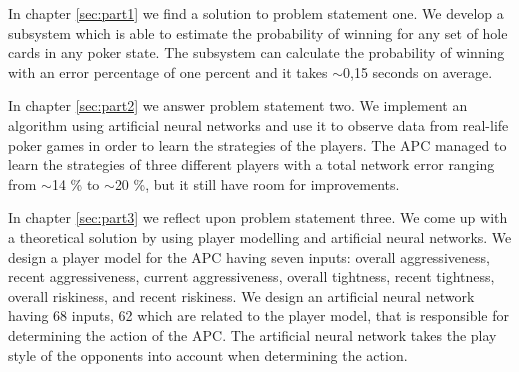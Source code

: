 In chapter \ref{sec:part1} we find a solution to problem statement one. We develop a subsystem which is able to estimate the probability of winning for any set of hole cards in any poker state. The subsystem can calculate the probability of winning with an error percentage of one percent and it takes $\sim$0,15 seconds on average.

In chapter \ref{sec:part2} we answer problem statement two. We implement an algorithm using artificial neural networks and use it to observe data from real-life poker games in order to learn the strategies of the players. The APC managed to learn the strategies of three different players with a total network error ranging from $\sim$14 \% to $\sim$20 \%, but it still have room for improvements.

In chapter \ref{sec:part3} we reflect upon problem statement three. We come up with a theoretical solution by using player modelling and artificial neural networks. We design a player model for the APC having seven inputs: overall aggressiveness, recent aggressiveness, current aggressiveness, overall tightness, recent tightness, overall riskiness, and recent riskiness. 
We design an artificial neural network having 68 inputs, 62 which are related to the player model, that is responsible for determining the action of the APC. The artificial neural network takes the play style of the opponents into account when determining the action.
